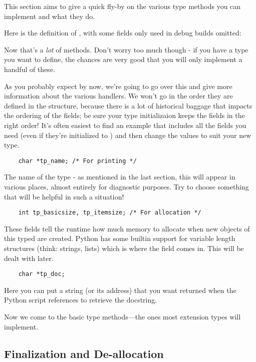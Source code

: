 This section aims to give a quick fly-by on the various type methods
you can implement and what they do.

Here is the definition of , with some fields only
used in debug builds omitted:



Now that's a \emph{lot} of methods.  Don't worry too much though - if
you have a type you want to define, the chances are very good that you
will only implement a handful of these.

As you probably expect by now, we're going to go over this and give
more information about the various handlers.  We won't go in the order
they are defined in the structure, because there is a lot of
historical baggage that impacts the ordering of the fields; be sure
your type initializaion keeps the fields in the right order!  It's
often easiest to find an example that includes all the fields you need
(even if they're initialized to ) and then change the values
to suit your new type.

\begin{verbatim}
    char *tp_name; /* For printing */
\end{verbatim}

The name of the type - as mentioned in the last section, this will
appear in various places, almost entirely for diagnostic purposes.
Try to choose something that will be helpful in such a situation!

\begin{verbatim}
    int tp_basicsize, tp_itemsize; /* For allocation */
\end{verbatim}

These fields tell the runtime how much memory to allocate when new
objects of this typed are created.  Python has some builtin support
for variable length structures (think: strings, lists) which is where
the  field comes in.  This will be dealt with
later.

\begin{verbatim}
    char *tp_doc;
\end{verbatim}

Here you can put a string (or its address) that you want returned when
the Python script references  to retrieve the
docstring.
   
Now we come to the basic type methods---the ones most extension types
will implement.


\subsection{Finalization and De-allocation}

